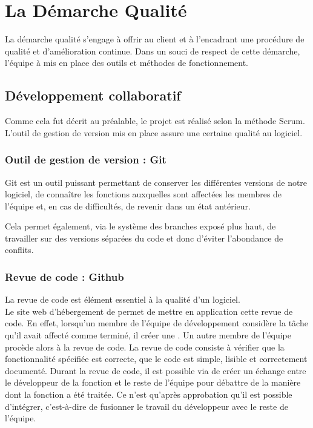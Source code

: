 \chapter{La Démarche Qualité}
La démarche qualité s'engage à offrir au client et à l'encadrant une procédure de qualité et d'amélioration continue. 
Dans un souci de respect de cette démarche, l'équipe à mis en place des outils et méthodes de fonctionnement. 
\section{Développement collaboratif}
Comme cela fut décrit au préalable, le projet est réalisé selon la méthode Scrum. L'outil de gestion de version  mis en place assure une certaine qualité au logiciel.
\subsection{Outil de gestion de version : Git}
Git est un outil puissant permettant de conserver les différentes versions de notre logiciel, de connaître les fonctions auxquelles sont affectées les membres de l'équipe et, en cas de difficultés, de revenir dans un état antérieur. 

Cela permet également, via le système des branches exposé plus haut, de travailler sur des versions séparées du code et donc d'éviter l'abondance de conflits.
\subsection{Revue de code : Github}
La revue de code est élément essentiel à la qualité d'un logiciel. \\
Le site web d'hébergement  de  permet de mettre en application cette revue de code. En effet, lorsqu'un membre de l'équipe de développement considère la tâche qu'il avait affecté comme terminé, il créer une . Un autre membre de l'équipe procède alors à la revue de code. La revue de code consiste à vérifier que la fonctionnalité spécifiée est correcte, que le code est simple, lisible et correctement documenté. Durant la revue de code, il est possible via  de créer un échange entre le développeur de la fonction et le reste de l'équipe pour débattre de la manière dont la fonction a été traitée. Ce n'est qu'après approbation qu'il est possible d'intégrer, c'est-à-dire de fusionner le travail du développeur avec le reste de l'équipe. 
